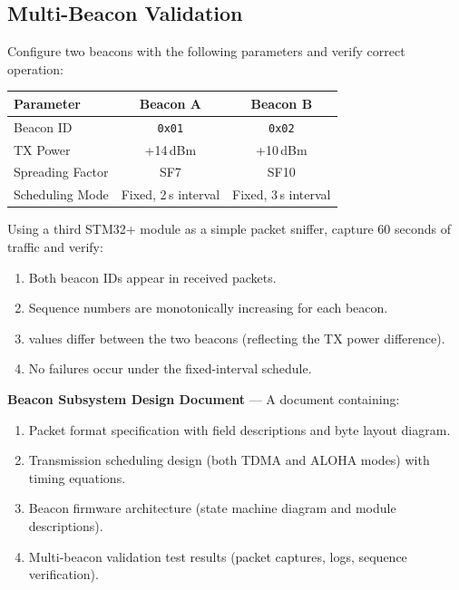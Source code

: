 \documentclass[11pt,letterpaper]{article}
\begin{document}
	\subsection{Multi-Beacon Validation}
	
	\begin{tcolorbox}[infobox={Exercise: Two-Beacon Concurrent Operation}]
		Configure two beacons with the following parameters and verify correct operation:
		
		\medskip
		\begin{tabular}{l c c}
			\toprule
			\textbf{Parameter} & \textbf{Beacon A} & \textbf{Beacon B} \\
			\midrule
			Beacon ID & \texttt{0x01} & \texttt{0x02} \\
			TX Power & +14\,dBm & +10\,dBm \\
			Spreading Factor & SF7 & SF10 \\
			Scheduling Mode & Fixed, 2\,s interval & Fixed, 3\,s interval \\
			\bottomrule
		\end{tabular}
		
		\medskip
		Using a third STM32+\RF{} module as a simple packet sniffer, capture 60 seconds of traffic and verify:
		\begin{enumerate}
			\item Both beacon IDs appear in received packets.
			\item Sequence numbers are monotonically increasing for each beacon.
			\item \RSSI{} values differ between the two beacons (reflecting the TX power difference).
			\item No \CRC{} failures occur under the fixed-interval schedule.
		\end{enumerate}
	\end{tcolorbox}
	
	\begin{tcolorbox}[deliverable={Week 3 Deliverable}]
		\textbf{Beacon Subsystem Design Document} --- A document containing:
		\begin{enumerate}
			\item Packet format specification with field descriptions and byte layout diagram.
			\item Transmission scheduling design (both TDMA and ALOHA modes) with timing equations.
			\item Beacon firmware architecture (state machine diagram and module descriptions).
			\item Multi-beacon validation test results (packet captures, \RSSI{} logs, sequence verification).
		\end{enumerate}
	\end{tcolorbox}
	
\end{document}
